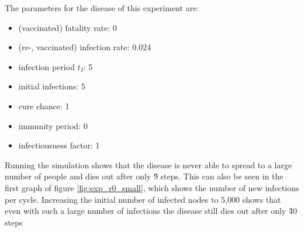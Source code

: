 The parameters for the disease of this experiment are:
\begin{itemize}
    \item (vaccinated) fatality rate: 0
    \item (re-, vaccinated) infection rate: 0.024
    \item infection period $t_I$: 5
    \item initial infections: 5
    \item cure chance: 1
    \item immunity period: 0
    \item infectiousness factor: 1
\end{itemize}

Running the simulation shows that the disease is never able to spread to a large number of people and dies out after only \~9 steps. This can also be seen in the first graph of figure \ref{fig:exp_r0_small}, which shows the number of new infections per cycle. Increasing the initial number of infected nodes to 5,000 shows that even with such a large number of infections the disease still dies out after only \~40 steps



